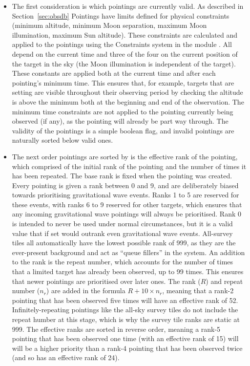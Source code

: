 \begin{colsection}
\begin{colsection}
\begin{itemize}
\item The first consideration is which pointings are currently valid. As described in Section~\ref{sec:obsdb} Pointings have limits defined for physical constraints (minimum altitude, minimum Moon separation, maximum Moon illumination, maximum Sun altitude). These constraints are calculated and applied to the pointings using the Constraints system in the   module \citep{astroplan}. All depend on the current time and three of the four on the current position of the target in the sky (the Moon illumination is independent of the target). These constants are applied both at the current time and after each pointing's minimum time. This ensures that, for example, targets that are setting are visible throughout their observing period by checking the altitude is above the minimum both at the beginning and end of the observation. The minimum time constraints are not applied to the pointing currently being observed (if any), as the pointing will already be part way through. The validity of the pointings is a simple boolean flag, and invalid pointings are naturally sorted below valid ones.

\item The next order pointings are sorted by is the effective rank of the pointing, which comprised of the initial rank of the pointing and the number of times it has been repeated. The base rank is fixed when the pointing was created. Every pointing is given a rank between 0 and 9, and are deliberately biased towards prioritising gravitational wave events. Ranks 1 to 5 are reserved for these events, with ranks 6 to 9 reserved for other targets, which ensures that any incoming gravitational wave pointings will always be prioritised. Rank 0 is intended to never be used under normal circumstances, but it is a valid value that if set would outrank even gravitational wave events. All-survey tiles all automatically have the lowest possible rank of 999, as they are the ever-present background and act as ``queue fillers'' in the system. An addition to the rank is the repeat number, which accounts for the number of times that a limited target has already been observed, up to 99 times. This ensures that newer pointings are prioritised over later ones. The rank ($R$) and repeat number ($n_r$) are added in the formula $R + 10\times n_r$, meaning that a rank-2 pointing that has been observed five times will have an effective rank of 52. Infinitely-repeating pointings like the all-sky survey tiles do not include the repeat humber at this stage, which is why the survey tile ranks are static at 999. The effective ranks are sorted in reverse order, meaning a rank-5 pointing that has been observed one time (with an effective rank of 15) will will be a higher priority than a rank-4 pointing that has been observed twice (and so has an effective rank of 24).


\end{itemize}
\end{colsection}
\end{colsection}
